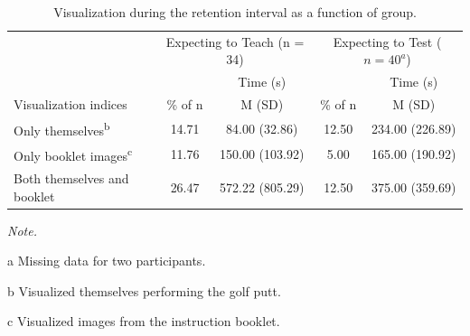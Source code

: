 \documentclass[
  english,
  man,floatsintext]{apa7}
\begin{document}
\begin{landscape}\begin{table}

\caption{\label{tab:table3}Visualization during the retention interval as a function of group.}
\fontsize{11}{13}\selectfont
\begin{threeparttable}
\begin{tabular}[t]{lcccc}
\toprule
\multicolumn{1}{c}{ } & \multicolumn{2}{c}{Expecting to Teach (n = 34)} & \multicolumn{2}{c}{Expecting to Test ($n = 40^{a}$)} \\
\cmidrule(l{3pt}r{3pt}){2-3} \cmidrule(l{3pt}r{3pt}){4-5}
\multicolumn{1}{c}{ } & \multicolumn{1}{c}{ } & \multicolumn{1}{c}{Time (s)} & \multicolumn{1}{c}{ } & \multicolumn{1}{c}{Time (s)} \\
\cmidrule(l{3pt}r{3pt}){3-3} \cmidrule(l{3pt}r{3pt}){5-5}
Visualization indices & \% of n & M (SD) & \% of n & M (SD)\\
\midrule
Only themselves\textsuperscript{b} & 14.71 & 84.00 (32.86) & 12.50 & 234.00 (226.89)\\
Only booklet images\textsuperscript{c} & 11.76 & 150.00 (103.92) & 5.00 & 165.00 (190.92)\\
Both themselves and booklet & 26.47 & 572.22 (805.29) & 12.50 & 375.00 (359.69)\\
\bottomrule
\end{tabular}
\begin{tablenotes}
\item \textit{Note.} 
\item[a] Missing data for two participants.
\item[b] Visualized themselves performing the golf putt.
\item[c] Visualized images from the instruction booklet.
\end{tablenotes}
\end{threeparttable}
\end{table}
\end{landscape}
\end{document}
